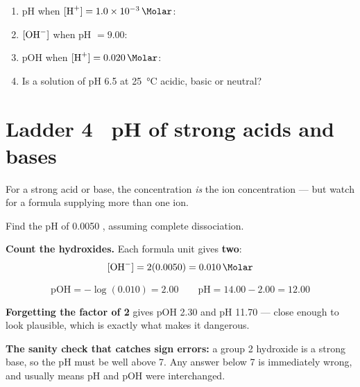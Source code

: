 \documentclass{apchem-worksheet}
\begin{document}
\begin{yourturn}
\begin{enumerate}[leftmargin=*,itemsep=0.5em]
  \item pH when $[\ce{H+}] = \SI{1.0e-3}{\Molar}$:
        \workspace[1.4cm]
  \item $[\ce{OH-}]$ when pH $= \num{9.00}$: \workspace[1.6cm]
  \item pOH when $[\ce{H+}] = \SI{0.020}{\Molar}$:
        \workspace[1.6cm]
  \item Is a solution of pH \num{6.5} at \SI{25}{\celsius} acidic, basic
        or neutral? \workspace[1.6cm]
\end{enumerate}
\end{yourturn}

\section*{\sffamily Ladder 4 \textbullet\ pH of strong acids and bases}

For a strong acid or base, the concentration \emph{is} the ion
concentration --- but watch for a formula supplying more than one ion.

\begin{workedexample}
Find the pH of \SI{0.0050}{\Molar} , assuming complete
dissociation.

\textbf{Count the hydroxides.} Each formula unit gives \textbf{two}:
\[ [\ce{OH-}] = 2(0.0050) = \SI{0.010}{\Molar} \]

\[ \text{pOH} = -\log(0.010) = 2.00 \qquad
   \text{pH} = 14.00 - 2.00 = \mathbf{12.00} \]

\textbf{Forgetting the factor of 2} gives pOH \num{2.30} and pH
\num{11.70} --- close enough to look plausible, which is exactly what makes
it dangerous.

\textbf{The sanity check that catches sign errors:} a group 2 hydroxide is
a strong base, so the pH must be well above 7. Any answer below 7 is
immediately wrong, and usually means pH and pOH were interchanged.
\end{workedexample}
\end{document}
